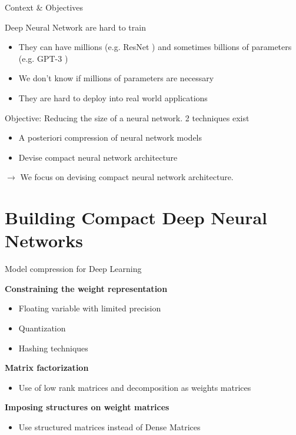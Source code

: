\documentclass[9pt]{beamer}
\begin{document}
\begin{frame}{Context \& Objectives}

\begin{block}{Deep Neural Network are hard to train}
\begin{itemize}
    \item They can have millions (e.g. ResNet \cite{he2016deep}) and sometimes billions of parameters (e.g. GPT-3 \cite{brown2020language})
    \item We don’t know if millions of parameters are necessary 
    \item They are hard to deploy into real world applications
\end{itemize}
\end{block}

\vspace{0.5cm}

\begin{block}{Objective: Reducing the size of a neural network. 2 techniques exist}
\begin{itemize}
    \item  A posteriori compression of neural network models 
    \item Devise compact neural network architecture 
\end{itemize}
\end{block}

$\rightarrow$ We focus on devising compact neural network architecture. 
    
\end{frame}

\section{Building Compact Deep Neural Networks}

\begin{frame}{Model compression for Deep Learning}

\textbf{Constraining the weight representation}
\begin{itemize}
  \item Floating variable with limited precision \cite{Gupta:2015:DLL:3045118.3045303}
  \item Quantization \cite{courbariaux2015binaryconnect,MellempudiKM0KD17, rastegariECCV16}
  \item Hashing techniques \cite{chen2015hashing}
\end{itemize}
 
\textbf{Matrix factorization}
\begin{itemize}
  \item Use of low rank matrices and decomposition as weights matrices \cite{NIPS2013_5025, Jaderberg2014SpeedingUC, 8099498}
\end{itemize}

\textbf{Imposing structures on weight matrices}
\begin{itemize}
    \item Use structured matrices instead of Dense Matrices \cite{7410684,NIPS2015_5869}
\end{itemize}

\end{frame}
\end{document}
